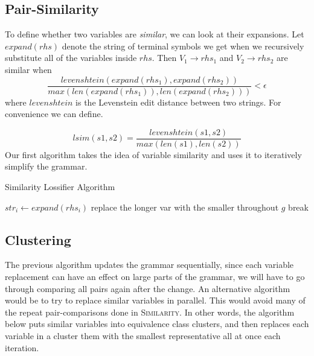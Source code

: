 \documentclass[11pt]{article}
\newcommand{\Similarity}{\textsc{Similarity}\xspace}
\begin{document}
\subsection{Pair-Similarity}

To define whether two variables are \emph{similar}, we can look at their
expansions. Let $expand(rhs)$ denote the string of terminal symbols we get when
we recursively substitute all of the variables inside $rhs$. Then $V_1
\rightarrow rhs_1$ and $V_2 \rightarrow rhs_2$ are similar when
\[
  \frac{levenshtein(expand(rhs_1),expand(rhs_2))}
      {max(len(expand(rhs_1)),len(expand(rhs_2)))} < \epsilon
\]
where $levenshtein$ is the Levenstein edit distance between two strings.  For
convenience we can define.

\[ lsim(s1,s2) = \frac{levenshtein(s1,s2)}{max(len(s1),len(s2))} \]
Our first algorithm takes the idea of variable similarity and uses it to
iteratively simplify the grammar.

\begin{algorithm}[h]
\caption{Similarity Lossifier Algorithm}
\label{sim_alg}
\begin{algorithmic}[1]
 
      \State $str_{i} \gets expand(rhs_i)$
        \State replace the longer var with the smaller throughout $g$
        \State break
      \EndIf
    \EndFor
  \EndWhile
\EndProcedure
\end{algorithmic}
\end{algorithm}

\subsection{Clustering}

The previous algorithm updates the grammar sequentially, since each variable
replacement can have an effect on large parts of the grammar, we will have to
go through comparing all pairs again after the change.  An alternative
algorithm would be to try to replace similar variables in parallel. This would
avoid many of the repeat pair-comparisons done in \Similarity. In other
words, the algorithm below puts similar variables into equivalence class
clusters, and then replaces each variable in a cluster them with the smallest
representative all at once each iteration.
\end{document}
